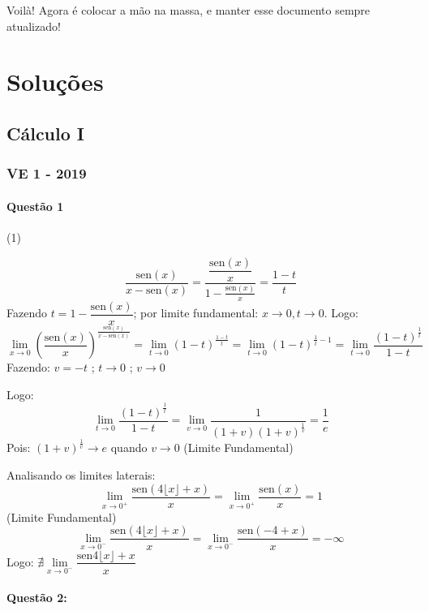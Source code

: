 \documentclass[12pt,a4paper]{article}
\newcommand{\sen}{\mathrm{sen}}
\begin{document}
Voilà! Agora é colocar a mão na massa, e manter esse documento sempre atualizado!

\newpage

\section{Soluções}

\subsection{Cálculo I}

\subsubsection {VE 1 - 2019}

\paragraph{Questão 1}

\begin{tasks}(1)
    
\task $$\dfrac{\sen{(x)}}{x - \sen{(x)}} = \dfrac{\dfrac{\sen{(x)}}{x}}{1 - \frac{\sen{(x)}}{x}} = \dfrac{1 - t}{t}$$
Fazendo $t = 1 - \dfrac{\sen{(x)}}{x}$; por limite fundamental: $x \rightarrow 0 , t \rightarrow 0$.
Logo: $$ \lim\limits_{x \to 0} \left(\dfrac{\sen{(x)}}{x}\right)^{\frac{\sen{(x)}}{x - \sen{(x)}}} = \lim\limits_{t \to 0} (1 - t)^{\frac{1 - t}{t}} = \lim\limits_{t \to 0} (1 - t)^{\frac{1}{t} - 1} = \lim\limits_{t \to 0} \dfrac{(1 - t)^\frac{1}{t}}{1 - t} $$ 
Fazendo: $ v = -t$ ;  $t \rightarrow 0$ ; $ v \rightarrow 0 $

Logo: $$ \lim\limits_{t \to 0} \dfrac{(1 - t)^\frac{1}{t}}{1 - t} = \lim\limits_{v \to 0} \dfrac{1}{(1 + v)(1 + v)^{\frac{1}{v}}} = \dfrac{1}{e} $$
Pois: $(1 + v)^\frac{1}{v} \rightarrow e $ quando $v \rightarrow 0 $ (Limite Fundamental)

\task Analisando os limites laterais: $$ \lim\limits_{x \to 0^{+}} \dfrac{\sen {(4 \lfloor x \rfloor + x)}}{x} = \lim\limits_{x \to 0^{+}} \dfrac{\sen {(x)}}{x} = 1$$  (Limite Fundamental)
$$ \lim\limits_{x \to 0^{-}} \dfrac{\sen {(4 \lfloor x \rfloor + x)}}{x} =  \lim\limits_{x \to 0^{-}} \dfrac{\sen {(-4 + x)}}{x} = - \infty $$
Logo: $\nexists \lim\limits_{x \to 0^{-}} \dfrac{\sen {4 \lfloor x \rfloor + x}}{x}$


\end{tasks}


\paragraph{Questão 2:}
\end{document}

